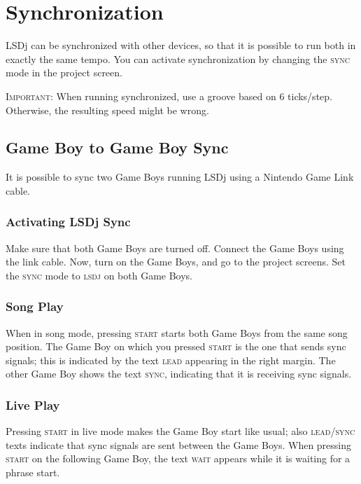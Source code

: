\chapter{Synchronization}
\label{sync-chapter}

LSDj can be synchronized with other devices, so that it is possible to run both in exactly the same tempo. You can activate synchronization by changing the \textsc{sync} mode in the project screen.

\textsc{Important}: When running synchronized, use a groove based on 6 ticks/step. Otherwise, the resulting speed might be wrong.

\section{Game Boy to Game Boy Sync}

It is possible to sync two Game Boys running LSDj using a Nintendo Game Link cable.

\subsection{Activating LSDj Sync}

Make sure that both Game Boys are turned off. Connect the Game Boys using the link cable. Now, turn on the Game Boys, and go to the project screens. Set the \textsc{sync} mode to \textsc{lsdj} on both Game Boys.

\subsection{Song Play}

When in song mode, pressing \textsc{start} starts both Game Boys from the same song position. The Game Boy on which you pressed \textsc{start} is the one that sends sync signals; this is indicated by the text \textsc{lead} appearing in the right margin. The other Game Boy shows the text \textsc{sync}, indicating that it is receiving sync signals.

\subsection{Live Play}

Pressing \textsc{start} in live mode makes the Game Boy start like usual; also \textsc{lead}/\textsc{sync} texts indicate that sync signals are sent between the Game Boys. When pressing \textsc{start} on the following Game Boy, the text \textsc{wait} appears while it is waiting for a phrase start.

